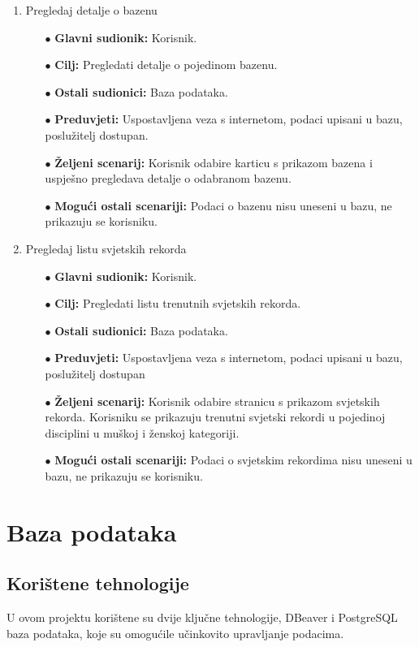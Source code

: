 \documentclass[times, utf8, zavrsni]{fer}
\begin{document}
\begin{enumerate}
    \item Pregledaj detalje o bazenu
    \begin{itemize}
        \item[$\bullet$] \textbf{Glavni sudionik:} Korisnik.
        \item[$\bullet$] \textbf{Cilj:} Pregledati detalje o pojedinom bazenu.
        \item[$\bullet$] \textbf{Ostali sudionici:} Baza podataka.
        \item[$\bullet$] \textbf{Preduvjeti:} Uspostavljena veza s internetom, podaci upisani u bazu, poslužitelj dostupan.
        \item[$\bullet$] \textbf{Željeni scenarij:} Korisnik odabire karticu s prikazom bazena i uspješno pregledava detalje o odabranom bazenu.
        \item[$\bullet$] \textbf{Mogući ostali scenariji:} Podaci o bazenu nisu uneseni u bazu, ne prikazuju se korisniku.
    \end{itemize}

    \item Pregledaj listu svjetskih rekorda
    \begin{itemize}
        \item[$\bullet$] \textbf{Glavni sudionik:} Korisnik.
        \item[$\bullet$] \textbf{Cilj:} Pregledati listu trenutnih svjetskih rekorda.
        \item[$\bullet$] \textbf{Ostali sudionici:} Baza podataka.
        \item[$\bullet$] \textbf{Preduvjeti:} Uspostavljena veza s internetom, podaci upisani u bazu, poslužitelj dostupan
        \item[$\bullet$] \textbf{Željeni scenarij:} Korisnik odabire stranicu s prikazom svjetskih rekorda. Korisniku se prikazuju trenutni svjetski rekordi
        u pojedinoj disciplini u muškoj i ženskoj kategoriji.
        \item[$\bullet$] \textbf{Mogući ostali scenariji:} Podaci o svjetskim rekordima nisu uneseni u bazu, ne prikazuju se korisniku.
    \end{itemize}

\end{enumerate}

\chapter{Baza podataka}

\section{Korištene tehnologije}
U ovom projektu korištene su dvije ključne tehnologije, DBeaver i PostgreSQL baza podataka, koje su omogućile
učinkovito upravljanje podacima.
\end{document}
